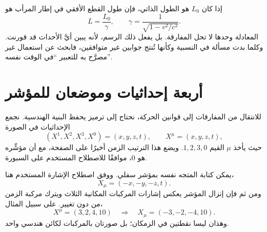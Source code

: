 \begin{classroomqa}
\end{classroomqa}

إذا كان \(L_0\) هو الطول الذاتي، فإن طول القطع الأفقي في إطار المرأب هو
\begin{equation}
L=\frac{L_0}{\gamma},
\qquad
\gamma=\frac{1}{\sqrt{1-v^2/c^2}}.
\end{equation}
المعادلة وحدها لا تحل المفارقة. بل يفعل ذلك الرسم، لأنه يبين أيَّ الأحداث قد قورنت. وكلما بدت مسألة في النسبية وكأنها تُنتج جوابين غير متوافقين، فابحث عن استعمال غير مصرَّح به للتعبير ``في الوقت نفسه''.

\section{أربعة إحداثيات وموضعان للمؤشر}

للانتقال من المفارقات إلى قوانين الحركة، نحتاج إلى ترميز يحفظ البنية الهندسية. نجمع الإحداثيات في الصورة
\begin{equation}
(X^1,X^2,X^3,X^0)=(x,y,z,t),
\qquad X^\mu=(x,y,z,t),
\end{equation}
حيث يأخذ \(\mu\) القيم \(1,2,3,0\). ويضع هذا الترتيب الزمن أخيرًا على الصفحة، مع أن مؤشِّره هو \(0\)، موافقًا للاصطلاح المستخدم على السبورة.

\begin{classroomqa}
\end{classroomqa}

يمكن كتابة المتجه نفسه بمؤشر سفلي. ووفق اصطلاح الإشارة المستخدم هنا،
\begin{equation}
X_\mu=(-x,-y,-z,t).
\end{equation}
ومن ثم فإن إنزال المؤشر يعكس إشارات المركبات المكانية الثلاث ويترك مركبة الزمن من دون تغيير. على سبيل المثال،
\begin{equation}
X^\mu=(3,2,4,10)
\quad\Longrightarrow\quad
X_\mu=(-3,-2,-4,10).
\end{equation}
وهذان ليسا نقطتين في الزمكان؛ بل صورتان بالمركبات لكائن هندسي واحد.

